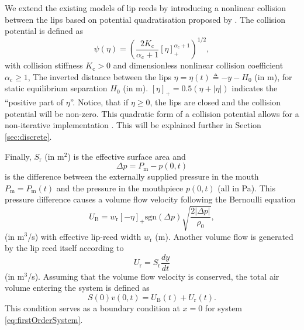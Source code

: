 We extend the existing models of lip reeds \cite{campbell2004brass} by introducing a nonlinear collision between the lips based on potential quadratisation proposed by \cite{Ducceschi2021}. The collision potential is defined as
\begin{equation}
    \psi(\eta) = \left(\frac{2K_\text{c}}{\alpha_\text{c}+1}[\eta]_+^{\alpha_\text{c}+1}
    \right)^{1/2}\!,
\end{equation}
with collision stiffness $K_\text{c}>0$ and dimensionless nonlinear collision coefficient $\alpha_\text{c}\geq 1$, The inverted distance between the lips $\eta = \eta(t) \triangleq -y-H_0$ (in m), for static equilibrium separation $H_0$ (in m). $[\eta]_+ = 0.5 (\eta + |\eta|)$ indicates the ``positive part of $\eta$''. Notice, that if $\eta 
\geq 0$, the lips are closed and the collision potential will be non-zero. This quadratic form of a collision potential allows for a non-iterative implementation \cite{Ducceschi2021}. This will be explained further in Section \ref{sec:discrete}.

Finally, $S_\text{r}$ (in m$^2$) is the effective surface area and 
\begin{equation}
    \Delta p = P_\text{m} - p(0,t)
\end{equation}
is the difference between the externally supplied pressure in the mouth $P_\text{m} = P_\text{m}(t)$ and the pressure in the mouthpiece $p(0, t)$ (all in Pa). This pressure difference causes a volume flow velocity following the Bernoulli equation
\begin{equation}
    U_\text{B} = w_\text{r}[-\eta]_+\text{sgn}(\Delta p) \sqrt{\frac{2|\Delta p|}{\rho_0}},
\end{equation}
(in m$^3$/s) with effective lip-reed width $w_\text{r}$ (m). %
Another volume flow is generated by the lip reed itself according to
\begin{equation}
    U_\text{r} = S_\text{r} \frac{dy}{dt}
\end{equation}
(in m$^3$/s).
Assuming that the volume flow velocity is conserved, the total air volume entering the system is defined as
\begin{equation}\label{eq:lipBoundary}
    S(0)v(0,t) = U_\text{B}(t) + U_\text{r}(t).
\end{equation}
This condition serves as a boundary condition at $x=0$ for system \eqref{eq:firstOrderSystem}.

